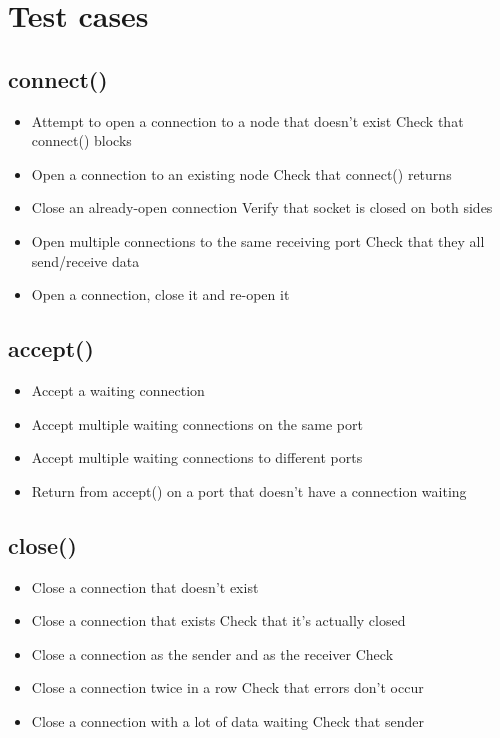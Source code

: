 \documentclass[]{article}
\begin{document}
\section{Test cases}
\subsection{connect()}
\begin{itemize}
	\item Attempt to open a connection to a node that doesn't exist
	\subitem Check that connect() blocks
	\item Open a connection to an existing node
	\subitem Check that connect() returns
	\item Close an already-open connection
	\subitem Verify that socket is closed on both sides
	\item Open multiple connections to the same receiving port
	\subitem Check that they all send/receive data
	\item Open a connection, close it and re-open it
\end{itemize}
\subsection{accept()}
\begin{itemize}
	\item Accept a waiting connection
	\item Accept multiple waiting connections on the same port
	\item Accept multiple waiting connections to different ports
	\item Return from accept() on a port that doesn't have a connection waiting
\end{itemize}
\subsection{close()}
\begin{itemize}
	\item Close a connection that doesn't exist
	\item Close a connection that exists
	\subitem Check that it's actually closed
	\item Close a connection as the sender and as the receiver
	\subitem Check 
	\item Close a connection twice in a row
	\subitem Check that errors don't occur
	\item Close a connection with a lot of data waiting
	\subitem Check that sender 
\end{itemize}
\end{document}
